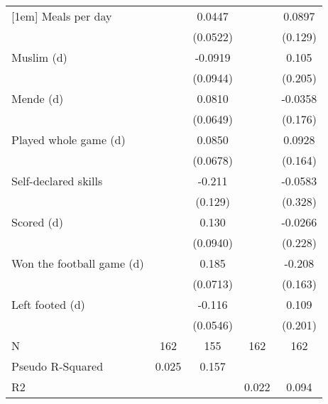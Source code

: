 {\begin{tabular}{l*{4}{c}}
[1em]
Meals per day       &                     &      0.0447         &                     &      0.0897         \\
                    &                     &    (0.0522)         &                     &     (0.129)         \\
[1em]
Muslim (d)          &                     &     -0.0919         &                     &       0.105         \\
                    &                     &    (0.0944)         &                     &     (0.205)         \\
[1em]
Mende (d)           &                     &      0.0810         &                     &     -0.0358         \\
                    &                     &    (0.0649)         &                     &     (0.176)         \\
[1em]
Played whole game (d)&                     &      0.0850         &                     &      0.0928         \\
                    &                     &    (0.0678)         &                     &     (0.164)         \\
[1em]
Self-declared skills&                     &      -0.211         &                     &     -0.0583         \\
                    &                     &     (0.129)         &                     &     (0.328)         \\
[1em]
Scored (d)          &                     &       0.130         &                     &     -0.0266         \\
                    &                     &    (0.0940)         &                     &     (0.228)         \\
[1em]
Won the football game (d)&                     &       0.185\sym{***}&                     &      -0.208         \\
                    &                     &    (0.0713)         &                     &     (0.163)         \\
[1em]
Left footed (d)     &                     &      -0.116\sym{**} &                     &       0.109         \\
                    &                     &    (0.0546)         &                     &     (0.201)         \\
\hline
N                   &         162         &         155         &         162         &         162         \\
Pseudo R-Squared    &       0.025         &       0.157         &                     &                     \\
R2                  &                     &                     &       0.022         &       0.094         \\
\hline\hline
\end{tabular}
}
